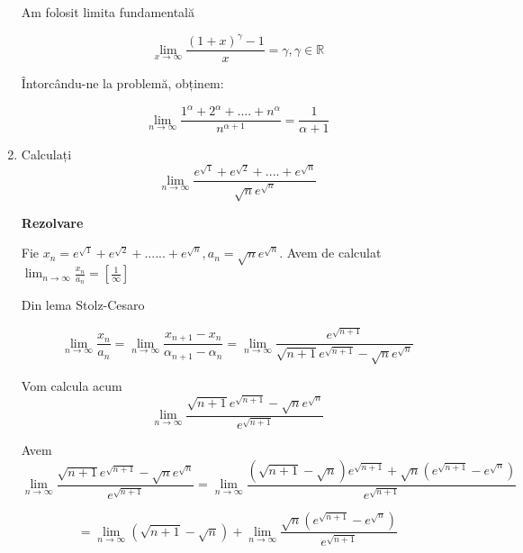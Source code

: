 \documentclass[a4paper,12pt,oneside]{report}
\begin{document}
\begin{enumerate}
Am folosit limita fundamentală 

\begin{displaymath}
  \lim_{x \to \infty }\frac{\left ( 1+x \right )^{\gamma }-1}{x} = \gamma ,\gamma \in \mathbb{R}
\end{displaymath}


Întorcându-ne la problemă, obținem:

\begin{displaymath}
  \lim_{n \to \infty }\frac{1^{\alpha }+2^{\alpha }+....+n^{\alpha }}{n^{\alpha +1}} = \frac{1}{\alpha +1}
\end{displaymath}


\item Calculați
\begin{displaymath}
  \lim_{n \to \infty }\frac{e^{\sqrt{1}}+ e^{\sqrt{2}}+....+e^{\sqrt{n}}}{\sqrt{n}e^{\sqrt{n}}}
\end{displaymath}


\textbf{Rezolvare}

Fie \( x_{n} = e^{\sqrt{1}}+ e^{\sqrt{2}}+......+e^{\sqrt{n}}, a_{n}= \sqrt{n}e^{\sqrt{n}}.\) Avem de calculat \(\lim_{n \to \infty }\frac{x_{n}}{a_{n}}= \left [ \frac{1}{\infty } \right ]\)


Din lema Stolz-Cesaro 


\begin{displaymath}
  \lim_{n \to \infty }\frac{x_{n}}{a_{n}}= \lim_{n \to \infty }\frac{x_{n+1}-x_{n}}{\alpha _{n+1}-\alpha _{n}}=\lim_{n \to \infty }\frac{e^{\sqrt{n+1}}}{\sqrt{n+1}e^{\sqrt{n+1}}-\sqrt{n}e^{\sqrt{n}}}
\end{displaymath}


Vom calcula acum 
\begin{displaymath}
  \lim_{n \to \infty }\frac{\sqrt{n+1}e^{\sqrt{n+1}}-\sqrt{n}e^{\sqrt{n}}}{e^{\sqrt{n+1}}}
\end{displaymath}


Avem 
\begin{displaymath}
  \lim_{n \to \infty }\frac{\sqrt{n+1}e^{\sqrt{n+1}}-\sqrt{n}e^{\sqrt{n}}}{e^{\sqrt{n+1}}} = \lim_{n \to \infty }\frac{\left ( \sqrt{n+1}-\sqrt{n} \right )e^{\sqrt{n+1}}+ \sqrt{n}\left ( e^{\sqrt{n+1}}-e^{\sqrt{n}} \right )}{e^{\sqrt{n+1}}}
\end{displaymath}

\begin{displaymath}
  = \lim_{n \to \infty }\left ( \sqrt{n+1}-\sqrt{n} \right )+ \lim_{n \to \infty }\frac{\sqrt{n}\left ( e^{\sqrt{n+1}} -e^{\sqrt{n}} \right )}{e^{\sqrt{n+1}}} 
\end{displaymath}



\end{enumerate}
\end{document}
